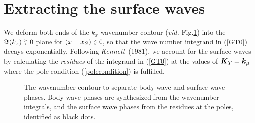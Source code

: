 \newpage
\section {Extracting  the surface waves}



We deform  both ends of the $k_x$ wavenumber contour 
({\em vid.\/} Fig.\ref{contour}) into the $\Im(k_x) \stackrel{\scriptscriptstyle >}{\scriptscriptstyle _<} 0$ plane for 
$(x-x_S) \stackrel{\scriptscriptstyle >}{\scriptscriptstyle _<} 0$, so that the wave number integrand in (\ref{GT0}) 
decays exponentially.
Following {\em Kennett\/}~(1981), we account for the surface waves by 
calculating the {\em residues\/} of the integrand in (\ref{GT0})  at the 
values of ${\mbox{\boldmath$\mit K$\unboldmath}}_{T}={\mbox{\boldmath$\mit k$\unboldmath}}_{\mu}$ where the pole condition 
(\ref{polecondition}) is fulfilled.

\begin{figure}
\HideDisplacementBoxes
\centerline{}
\caption{The wavenumber contour to separate body wave and surface wave 
phases. Body wave phases are synthesized from the wavenumber integrals, 
and the surface wave phases from the residues at the poles, identified
as black dots. }
\protect\label{contour}
\end{figure}
 

